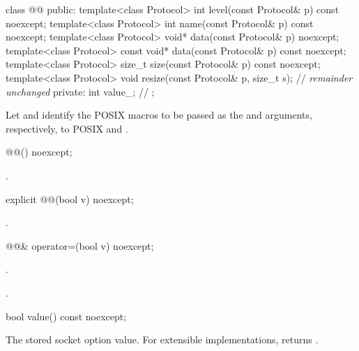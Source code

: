 \begin{codeblock}
class @@
{
public:
  template<class Protocol> int level(const Protocol& p) const noexcept;
  template<class Protocol> int name(const Protocol& p) const noexcept;
  template<class Protocol> void* data(const Protocol& p) noexcept;
  template<class Protocol> const void* data(const Protocol& p) const noexcept;
  template<class Protocol> size_t size(const Protocol& p) const noexcept;
  template<class Protocol> void resize(const Protocol& p, size_t s);
  // \textit{remainder unchanged}
private:
  int value_; // \expos
};
\end{codeblock}

\pnum
Let  and  identify the POSIX macros to be passed as the  and  arguments, respectively, to POSIX  and .

\begin{itemdecl}
@@() noexcept;
\end{itemdecl}

\begin{itemdescr}
\pnum
\postconditions {}.
\end{itemdescr}

\begin{itemdecl}
explicit @@(bool v) noexcept;
\end{itemdecl}

\begin{itemdescr}
\pnum
\postconditions {}.
\end{itemdescr}

\begin{itemdecl}
@@& operator=(bool v) noexcept;
\end{itemdecl}

\begin{itemdescr}
\pnum
\returns {}.

\pnum
\postconditions {}.
\end{itemdescr}

\begin{itemdecl}
bool value() const noexcept;
\end{itemdecl}

\begin{itemdescr}
\pnum
\returns The stored socket option value. For extensible implementations, returns .
\end{itemdescr}

